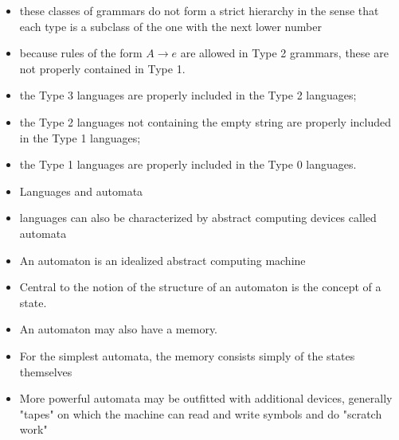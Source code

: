 \documentclass{beamer}
\begin{document}
	\begin{frame}
		\begin{itemize}
			\item these classes of grammars do not form a strict hierarchy in the sense that each type is a subclass of the one with the next lower number
			\item because rules of the form $A \rightarrow e$ are allowed in Type 2 grammars, these are not properly contained in Type 1.
		\end{itemize}
	\end{frame}


	\begin{frame}
		\begin{itemize}
			\item the Type 3 languages are properly included in the Type 2 languages;
			\item the Type 2 languages not containing the empty string are properly included in the Type 1 languages;
			\item the Type 1 languages are properly included in the Type 0 languages.
		\end{itemize}
	\end{frame}


	\begin{frame}
		\begin{itemize}
			\item Languages and automata
			\item languages can also be characterized by abstract computing devices called automata
			\item An automaton is an idealized abstract computing machine
		\end{itemize}
	\end{frame}


	\begin{frame}
		\begin{itemize}
			\item Central to the notion of the structure of an automaton is the concept of a state.
			\item An automaton may also have a memory.
			\item For the simplest automata, the memory consists simply of the states themselves
			\item More powerful automata may be outfitted with additional devices, generally "tapes" on which the machine can read and write symbols and do "scratch work"
		\end{itemize}
	\end{frame}
\end{document}
